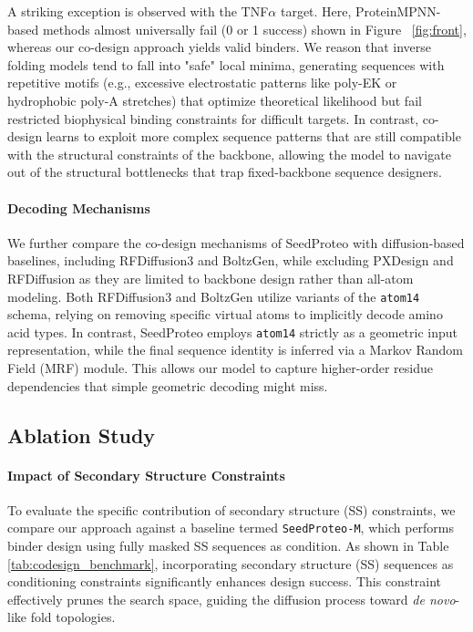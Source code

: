 \documentclass[]{bytedance_seed}
\begin{document}
A striking exception is observed with the TNF$\alpha$ target. Here, ProteinMPNN-based methods almost universally fail (0 or 1 success) shown in Figure ~\ref{fig:front}, whereas our co-design approach yields valid binders. We reason that inverse folding models tend to fall into "safe" local minima, generating sequences with repetitive motifs (e.g., excessive electrostatic patterns like poly-EK or hydrophobic poly-A stretches) that optimize theoretical likelihood but fail restricted biophysical binding constraints for difficult targets. In contrast, co-design learns to exploit more complex sequence patterns that are still compatible with the structural constraints of the backbone, allowing the model to navigate out of the structural bottlenecks that trap fixed-backbone sequence designers.

\paragraph{Decoding Mechanisms}
We further compare the co-design mechanisms of SeedProteo with diffusion-based baselines, including RFDiffusion3 and BoltzGen, while excluding PXDesign and RFDiffusion as they are limited to backbone design rather than all-atom modeling. Both RFDiffusion3 and BoltzGen utilize variants of the \texttt{atom14} schema, relying on removing specific virtual atoms to implicitly decode amino acid types. In contrast, SeedProteo employs \texttt{atom14} strictly as a geometric input representation, while the final sequence identity is inferred via a Markov Random Field (MRF) module. This allows our model to capture higher-order residue dependencies that simple geometric decoding might miss. 


\subsection{Ablation Study}
\paragraph{Impact of Secondary Structure Constraints}
To evaluate the specific contribution of secondary structure (SS) constraints, we compare our approach against a baseline termed \texttt{SeedProteo-M}, which performs binder design using fully masked SS sequences as condition. As shown in Table \ref{tab:codesign_benchmark}, incorporating secondary structure (SS) sequences as conditioning constraints significantly enhances design success. This constraint effectively prunes the search space, guiding the diffusion process toward \textit{de novo}-like fold topologies.
\end{document}
